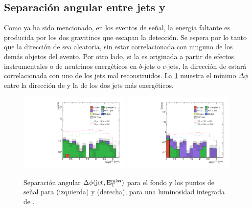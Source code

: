 \subsection{Separación angular entre jets y \met}
\label{sec:dphi_obj}

Como ya ha sido mencionado, en los eventos de señal, la energía faltante es producida por los dos
gravitinos que escapan la detección. Se espera por lo tanto que la dirección de {\met} sea aleatoria,
sin estar correlacionada con ninguno de los demás objetos del evento. Por otro
lado, si la {\met} es originada a partir de efectos instrumentales o de neutrinos
energéticos en $b$-jets o $c$-jets, la dirección de {\met} estará
correlacionada con uno de los jets mal reconstruidos. La
\cref{fig:opt_dphi_jetmet} muestra el mínimo $\Delta\phi$ entre la dirección
de {\met} y la de los dos jets más energéticos.



\begin{figure}[!h]
  \centering

  \includegraphics[width=0.49\textwidth]{figures/dphi_jetmet_srl}
  \includegraphics[width=0.49\textwidth]{figures/dphi_jetmet_srh}

  \caption{Separación angular $\Delta \phi \mathrm{(jet, E_{\mathrm{T}}^{\mathrm{miss}})}$ para el fondo y los puntos de se\~nal para {\SRL} (izquierda) y {\SRH} (derecha),
    para una luminosidad integrada de {\ilumi}.}
  \label{fig:opt_dphi_jetmet}
\end{figure}


